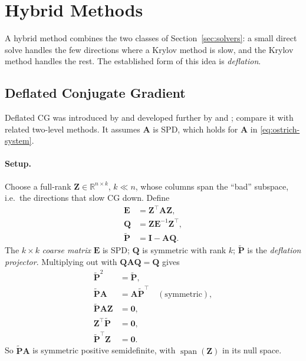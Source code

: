 \section{Hybrid Methods}
\label{sec:hybrid-methods}

A hybrid method combines the two classes of Section~\ref{sec:solvers}: a
small direct solve handles the few directions where a Krylov method is slow,
and the Krylov method handles the rest. The established form of this idea is
\emph{deflation}.

\subsection{Deflated Conjugate Gradient}
\label{sec:deflated-cg}

Deflated CG was introduced by \citet{nicolaides1987deflation} and developed
further by \citet{saad2000deflated} and \citet{frank2001construction};
\citet{tang2009comparison} compare it with related two-level methods. It
assumes $\mathbf{A}$ is SPD, which holds for $\mathbf{A}$ in
\eqref{eq:ostrich-system}.

\paragraph{Setup.}
Choose a full-rank $\mathbf{Z} \in \mathbb{R}^{n \times k}$, $k \ll n$, whose
columns span the ``bad'' subspace, i.e.\ the directions that slow CG down.
Define
\begin{equation}
  \begin{aligned}
    \mathbf{E} &= \mathbf{Z}^\top \mathbf{A} \mathbf{Z}, \\
    \mathbf{Q} &= \mathbf{Z} \mathbf{E}^{-1} \mathbf{Z}^\top, \\
    \tilde{\mathbf{P}} &= \mathbf{I} - \mathbf{A}\mathbf{Q} .
  \end{aligned}
  \label{eq:deflation-setup}
\end{equation}
The $k \times k$ \emph{coarse matrix} $\mathbf{E}$ is SPD; $\mathbf{Q}$ is
symmetric with rank $k$; $\tilde{\mathbf{P}}$ is the \emph{deflation projector}.
Multiplying out with $\mathbf{Q}\mathbf{A}\mathbf{Q} = \mathbf{Q}$ gives
\begin{equation}
  \begin{aligned}
    \tilde{\mathbf{P}}^2 &= \tilde{\mathbf{P}}, \\
    \tilde{\mathbf{P}} \mathbf{A} &= \mathbf{A} \tilde{\mathbf{P}}^\top \quad (\text{symmetric}), \\
    \tilde{\mathbf{P}} \mathbf{A} \mathbf{Z} &= \mathbf{0}, \\
    \mathbf{Z}^\top \tilde{\mathbf{P}} &= \mathbf{0}, \\
    \tilde{\mathbf{P}}^\top \mathbf{Z} &= \mathbf{0} .
  \end{aligned}
  \label{eq:deflation-identities}
\end{equation}
So $\tilde{\mathbf{P}}\mathbf{A}$ is symmetric positive semidefinite, with
$\operatorname{span}(\mathbf{Z})$ in its null space.


